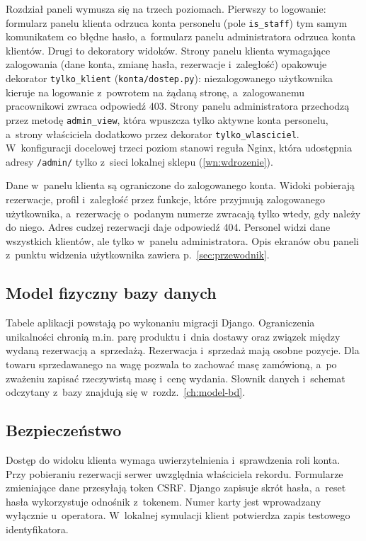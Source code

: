\documentclass[12pt,a4paper,oneside]{article}
\newcounter{pu}
\begin{document}
Rozdział paneli wymusza się na trzech poziomach. Pierwszy to logowanie: formularz panelu klienta odrzuca konta personelu (pole \texttt{is\_staff}) tym samym komunikatem co błędne hasło, a~formularz panelu administratora odrzuca konta klientów. Drugi to dekoratory widoków. Strony panelu klienta wymagające zalogowania (dane konta, zmianę hasła, rezerwacje i~zaległość) opakowuje dekorator \texttt{tylko\_klient} (\texttt{konta/dostep.py}): niezalogowanego użytkownika kieruje na logowanie z~powrotem na żądaną stronę, a~zalogowanemu pracownikowi zwraca odpowiedź 403. Strony panelu administratora przechodzą przez metodę \texttt{admin\_view}, która wpuszcza tylko aktywne konta personelu, a~strony właściciela dodatkowo przez dekorator \texttt{tylko\_wlasciciel}. W~konfiguracji docelowej trzeci poziom stanowi reguła Nginx, która udostępnia adresy \texttt{/admin/} tylko z~sieci lokalnej sklepu (\ref{wn:wdrozenie}).

Dane w~panelu klienta są ograniczone do zalogowanego konta. Widoki pobierają rezerwacje, profil i~zaległość przez funkcje, które przyjmują zalogowanego użytkownika, a~rezerwację o~podanym numerze zwracają tylko wtedy, gdy należy do niego. Adres cudzej rezerwacji daje odpowiedź 404. Personel widzi dane wszystkich klientów, ale tylko w~panelu administratora. Opis ekranów obu paneli z~punktu widzenia użytkownika zawiera p.~\ref{sec:przewodnik}.


\subsection{Model fizyczny bazy danych}

Tabele aplikacji powstają po wykonaniu migracji Django. Ograniczenia unikalności chronią m.in. parę produktu i~dnia dostawy oraz związek między wydaną rezerwacją a~sprzedażą. Rezerwacja i~sprzedaż mają osobne pozycje. Dla towaru sprzedawanego na wagę pozwala to zachować masę zamówioną, a~po zważeniu zapisać rzeczywistą masę i~cenę wydania. Słownik danych i~schemat odczytany z~bazy znajdują się w~rozdz.~\ref{ch:model-bd}.


\subsection{Bezpieczeństwo}

Dostęp do widoku klienta wymaga uwierzytelnienia i~sprawdzenia roli konta. Przy pobieraniu rezerwacji serwer uwzględnia właściciela rekordu. Formularze zmieniające dane przesyłają token CSRF. Django zapisuje skrót hasła, a~reset hasła wykorzystuje odnośnik z~tokenem. Numer karty jest wprowadzany wyłącznie u~operatora. W~lokalnej symulacji klient potwierdza zapis testowego identyfikatora.
\end{document}
